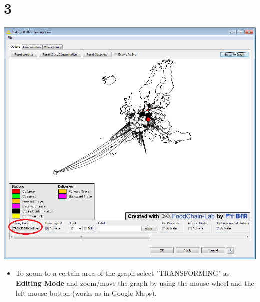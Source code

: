 \documentclass{beamer}
\begin{document}
\section{3}
\begin{frame}
	\begin{center}
  		\includegraphics[height=0.6\textheight]{3.png}
	\end{center}
	\begin{itemize}
		\item To zoom to a certain area of the graph select "TRANSFORMING" as \textbf{Editing Mode} and zoom/move the graph by using the mouse wheel and the left mouse button (works as in Google Maps).
	\end{itemize}
\end{frame}
\end{document}
